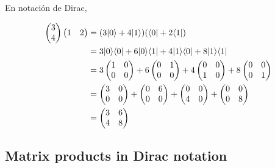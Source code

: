 \documentclass[osajnl,preprint,showpacs,superscriptaddress,10pt]{revtex4-1} %
\DeclarePairedDelimiter\bra{\langle}{\rvert}
\DeclarePairedDelimiter\ket{\lvert}{\rangle}
\begin{document}
\begin{itemize}
    En notación de Dirac,
    \begin{fleqn}[\parindent]
    \begin{equation}
    \begin{split}
        \begin{pmatrix}3 \\ 4\end{pmatrix}\begin{pmatrix}1 & 2\end{pmatrix}
            &= (3\ket{0} + 4\ket{1})(\bra{0} + 2\bra{1}) \\
            &= 3\ket{0}\bra{0} + 6\ket{0}\bra{1} + 4\ket{1}\bra{0} + 8\ket{1}\bra{1} \\
            &= 3\begin{pmatrix}1 & 0 \\ 0 & 0\end{pmatrix} + 6\begin{pmatrix}0 & 1 \\ 0 & 0\end{pmatrix} + 4\begin{pmatrix}0 & 0 \\ 1 & 0\end{pmatrix} + 8\begin{pmatrix}0 & 0 \\ 0 & 1\end{pmatrix} \\
            &= \begin{pmatrix}3 & 0 \\ 0 & 0\end{pmatrix} + \begin{pmatrix}0 & 6 \\ 0 & 0\end{pmatrix} + \begin{pmatrix}0 & 0 \\ 4 & 0\end{pmatrix} + \begin{pmatrix}0 & 0 \\ 0 & 8\end{pmatrix} \\
            &= \begin{pmatrix}3 & 6 \\ 4 & 8\end{pmatrix}
    \end{split}
    \end{equation}
    \end{fleqn}
\end{itemize}

\subsection{Matrix products in Dirac notation}
\end{document}
